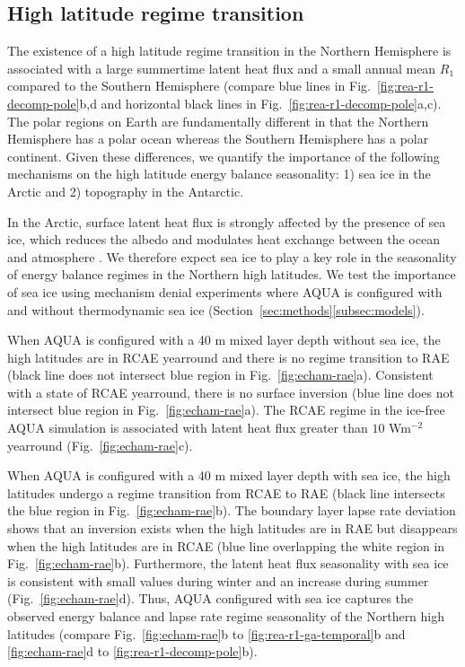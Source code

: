 \documentclass{ametsocV5}
\begin{document}
  \subsection{High latitude regime transition} \label{subsec:ice}
  The existence of a high latitude regime transition in the Northern Hemisphere is associated with a large summertime latent heat flux and a small annual mean $R_1$ compared to the Southern Hemisphere (compare blue lines in Fig.~\ref{fig:rea-r1-decomp-pole}b,d and horizontal black lines in Fig.~\ref{fig:rea-r1-decomp-pole}a,c). The polar regions on Earth are fundamentally different in that the Northern Hemisphere has a polar ocean whereas the Southern Hemisphere has a polar continent. Given these differences, we quantify the importance of the following mechanisms on the high latitude energy balance seasonality: 1) sea ice in the Arctic and 2) topography in the Antarctic.
  
  In the Arctic, surface latent heat flux is strongly affected by the presence of sea ice, which reduces the albedo and modulates heat exchange between the ocean and atmosphere \citep{andreas1979, maykut1982}. We therefore expect sea ice to play a key role in the seasonality of energy balance regimes in the Northern high latitudes. We test the importance of sea ice using mechanism denial experiments where AQUA is configured with and without thermodynamic sea ice (Section~\ref{sec:methods}\ref{subsec:models}).
  
  When AQUA is configured with a 40 m mixed layer depth without sea ice, the high latitudes are in RCAE yearround and there is no regime transition to RAE (black line does not intersect blue region in Fig.~\ref{fig:echam-rae}a). Consistent with a state of RCAE yearround, there is no surface inversion (blue line does not intersect blue region in Fig.~\ref{fig:echam-rae}a). The RCAE regime in the ice-free AQUA simulation is associated with latent heat flux greater than $10$ Wm$^{-2}$ yearround (Fig.~\ref{fig:echam-rae}c).
  
  When AQUA is configured with a 40 m mixed layer depth with sea ice, the high latitudes undergo a regime transition from RCAE to RAE (black line intersects the blue region in Fig.~\ref{fig:echam-rae}b). The boundary layer lapse rate deviation shows that an inversion exists when the high latitudes are in RAE but disappears when the high latitudes are in RCAE (blue line overlapping the white region in Fig.~\ref{fig:echam-rae}b). Furthermore, the latent heat flux seasonality with sea ice is consistent with small values during winter and an increase during summer (Fig.~\ref{fig:echam-rae}d). Thus, AQUA configured with sea ice captures the observed energy balance and lapse rate regime seasonality of the Northern high latitudes (compare Fig.~\ref{fig:echam-rae}b to \ref{fig:rea-r1-ga-temporal}b and \ref{fig:echam-rae}d to \ref{fig:rea-r1-decomp-pole}b).
\end{document}
